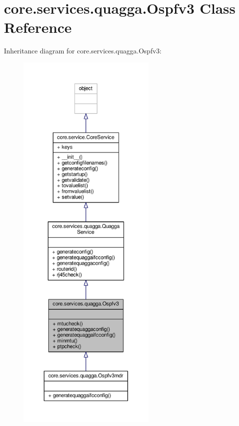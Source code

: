 \hypertarget{classcore_1_1services_1_1quagga_1_1_ospfv3}{\section{core.\+services.\+quagga.\+Ospfv3 Class Reference}
\label{classcore_1_1services_1_1quagga_1_1_ospfv3}
}


Inheritance diagram for core.\+services.\+quagga.\+Ospfv3\+:
\nopagebreak
\begin{figure}[H]
\begin{center}
\leavevmode
\includegraphics[height=550pt]{classcore_1_1services_1_1quagga_1_1_ospfv3__inherit__graph}
\end{center}
\end{figure}


